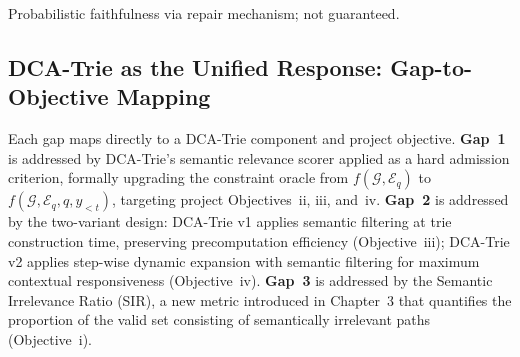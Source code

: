 \begin{table}[H]
    \centering
    \caption{Consolidated gap matrix for KG-constrained decoding frameworks.}
    \label{tab:gaps}
    \small
    \begin{threeparttable}
        \begin{tablenotes}
            \item[a] Probabilistic faithfulness via repair mechanism; not guaranteed.
        \end{tablenotes}
    \end{threeparttable}
\end{table}

\subsection{DCA-Trie as the Unified Response: Gap-to-Objective Mapping}

Each gap maps directly to a DCA-Trie component and project objective. \textbf{Gap~1} is addressed by DCA-Trie's semantic relevance scorer applied as a hard admission criterion, formally upgrading the constraint oracle from $f(\mathcal{G}, \mathcal{E}_q)$ to $f(\mathcal{G}, \mathcal{E}_q, q, y_{<t})$, targeting project Objectives~ii, iii, and~iv. \textbf{Gap~2} is addressed by the two-variant design: DCA-Trie v1 applies semantic filtering at trie construction time, preserving precomputation efficiency (Objective~iii); DCA-Trie v2 applies step-wise dynamic expansion with semantic filtering for maximum contextual responsiveness (Objective~iv). \textbf{Gap~3} is addressed by the Semantic Irrelevance Ratio (SIR), a new metric introduced in Chapter~3 that quantifies the proportion of the valid set consisting of semantically irrelevant paths (Objective~i).

